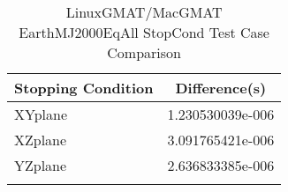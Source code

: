 \begin{table}[htbp!]
\centering
\caption{ LinuxGMAT/MacGMAT EarthMJ2000EqAll StopCond Test Case Comparison}
      \begin{tabular}{lc}
      \hline\hline
          Stopping Condition & Difference(s) \\
         \hline
         XYplane & 1.230530039e-006 \\
         XZplane & 3.091765421e-006 \\
         YZplane & 2.636833385e-006 \\
      \hline\hline
      \label{Table: LinuxGMAT-MacGMAT EarthMJ2000EqAll StopCond Table} 
\end{tabular}
\end{table}
